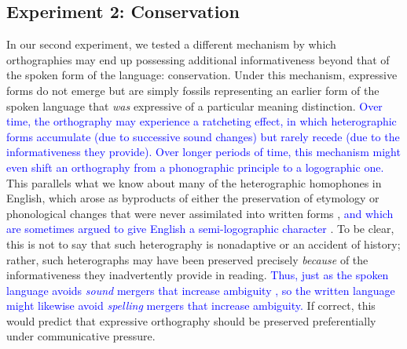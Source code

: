 \documentclass[doc,biblatex]{apa7}
\newcommand\newmaterial[1]{\textcolor{blue}{#1}}
\begin{document}
\subsection{Experiment 2: Conservation}

In our second experiment, we tested a different mechanism by which orthographies may end up possessing additional informativeness beyond that of the spoken form of the language: conservation. Under this mechanism, expressive forms do not emerge but are simply fossils representing an earlier form of the spoken language that \textit{was} expressive of a particular meaning distinction. \newmaterial{Over time, the orthography may experience a ratcheting effect, in which heterographic forms accumulate (due to successive sound changes) but rarely recede (due to the informativeness they provide). Over longer periods of time, this mechanism might even shift an orthography from a phonographic principle to a logographic one.} This parallels what we know about many of the heterographic homophones in English, which arose as byproducts of either the preservation of etymology or phonological changes that were never assimilated into written forms \parencite{Berg:2021}, \newmaterial{and which are sometimes argued to give English a semi-logographic character \parencite{Chomsky:1968, Coulmas:1991, DeFransis:1989, Zachrisson:1931}}. To be clear, this is not to say that such heterography is nonadaptive or an accident of history; rather, such heterographs may have been preserved precisely \textit{because} of the informativeness they inadvertently provide in reading. \newmaterial{Thus, just as the spoken language avoids \textit{sound} mergers that increase ambiguity \parencite[e.g.,][]{Wedel:2013}, so the written language might likewise avoid \textit{spelling} mergers that increase ambiguity.} If correct, this would predict that expressive orthography should be preserved preferentially under communicative pressure.
\end{document}
